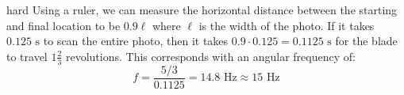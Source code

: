 \begin{solution}{hard}
Using a ruler, we can measure the horizontal distance between the starting and final location to be $0.9\ell$ where $\ell$ is the width of the photo. If it takes $0.125 \text{ s}$ to scan the entire photo, then it takes $0.9\cdot 0.125=0.1125 \text{ s}$ for the blade to travel $1 \frac{2}{3}$ revolutions. This corresponds with an angular frequency of:
$$f = \frac{5/3}{0.1125}=14.8 \text{ Hz} \approx \boxed{15 \text{ Hz}}$$ 
\end{solution}
\newpage